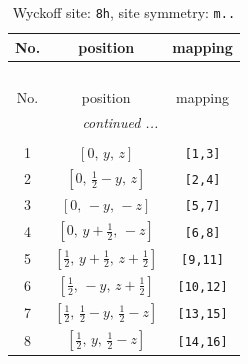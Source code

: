 \documentclass[fleqn,8pt]{jsarticle}
\begin{document}
\begin{longtable}{ccc}
\caption{Wyckoff site: {\tt 8h}, site symmetry: {\tt m..}}
 \\
 \hline \hline
No. & position & mapping \\ \hline \endfirsthead

\multicolumn{2}{l}{\tablename\ \thetable{}} \\
 \hline \hline
No. & position & mapping \\ \hline \endhead

 \hline \hline
\multicolumn{2}{r}{\footnotesize\it continued ...} \\ \endfoot

 \hline \hline
\multicolumn{2}{r}{} \\ \endlastfoot

1 & $\left[ 0,\, y,\, z \right]$ & {\tt [1,3]} \\ \hline
2 & $\left[ 0,\, \frac{1}{2} - y,\, z \right]$ & {\tt [2,4]} \\ \hline
3 & $\left[ 0,\, - y,\, - z \right]$ & {\tt [5,7]} \\ \hline
4 & $\left[ 0,\, y + \frac{1}{2},\, - z \right]$ & {\tt [6,8]} \\ \hline
5 & $\left[ \frac{1}{2},\, y + \frac{1}{2},\, z + \frac{1}{2} \right]$ & {\tt [9,11]} \\ \hline
6 & $\left[ \frac{1}{2},\, - y,\, z + \frac{1}{2} \right]$ & {\tt [10,12]} \\ \hline
7 & $\left[ \frac{1}{2},\, \frac{1}{2} - y,\, \frac{1}{2} - z \right]$ & {\tt [13,15]} \\ \hline
8 & $\left[ \frac{1}{2},\, y,\, \frac{1}{2} - z \right]$ & {\tt [14,16]} \\
\end{longtable}
\renewcommand{\arraystretch}{1.2}
\end{document}
